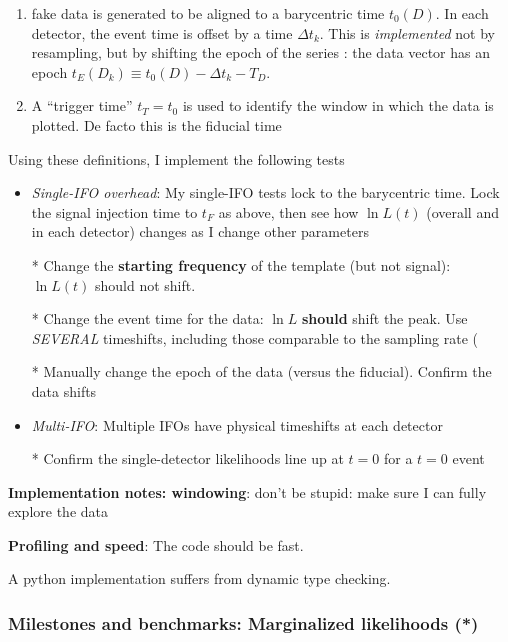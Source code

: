 \documentclass[twocolumn,prd,nofootinbib]{revtex4}
\newcommand\editremark[1]{{\color{red} #1}}
\begin{document}
\begin{widetext}
\begin{widetext}
\begin{enumerate}
\item fake data is generated  to be aligned to a barycentric time $t_0(D)$.  In each detector, the event time is offset
  by a time $\Delta t_k$.  This is \emph{implemented} not by
  resampling, but by shifting the epoch of the series : the data vector has an epoch $t_{E}(D_k)\equiv t_{0}(D) - \Delta
  t_k - T_D$.
\item A ``trigger time''  $t_T = t_0$ is used to identify the window in which the data is plotted. De facto this is the
  fiducial time
\end{enumerate}
%
Using these definitions, I implement the following tests
\begin{itemize}
\item \emph{Single-IFO overhead}: My single-IFO tests lock to the barycentric time. Lock the signal injection time to $t_F$ as above, then see how $\ln L(t)$ (overall and
  in each detector) changes as I change other parameters

* Change the \textbf{starting frequency} of the template (but not signal): $\ln L(t)$ should not shift.  

* Change the event time for the data: $\ln L$ \textbf{should} shift the peak.  Use \emph{SEVERAL} timeshifts, including
those comparable to the sampling rate (

* Manually change the epoch of the data (versus the fiducial).  Confirm the data shifts

\item \emph{Multi-IFO}: Multiple IFOs have physical timeshifts at each detector

* Confirm the single-detector likelihoods line up at $t=0$ for a $t=0$ event

\end{itemize}


\noindent \textbf{Implementation notes: windowing}: \editremark{don't be stupid}: make sure I can fully explore the data

\noindent \textbf{Profiling and speed}: The code should be fast.

\begin{shaded}
A python implementation suffers from dynamic type checking.
\end{shaded}


\subsubsection{Milestones and benchmarks: Marginalized likelihoods (*)}


\end{widetext}
\end{widetext}
\end{document}
